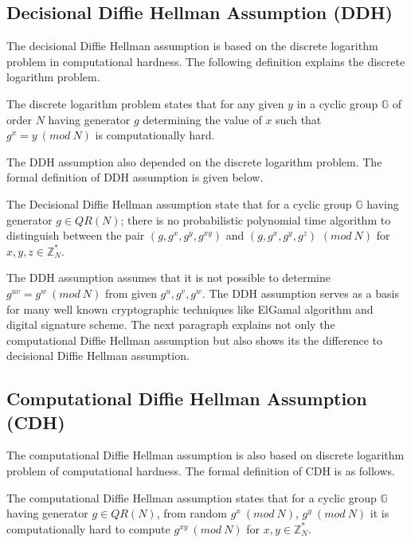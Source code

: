\subsection{Decisional Diffie Hellman Assumption (DDH)}\label{sub:DDH}
The decisional Diffie Hellman assumption is based on the discrete logarithm problem in computational hardness. The following definition explains the discrete logarithm problem.
\begin{definition} The discrete logarithm problem states that for any given $y$ in a cyclic group $\mathbb{G}$ of order $N$ having generator $g$ determining the value of $x$ such that $g^x = y ~(mod~N)$ is computationally hard.
\end{definition}

The DDH assumption also depended on the discrete logarithm problem. The formal definition of DDH assumption is given below.

\begin{definition} The Decisional Diffie Hellman assumption state that for a cyclic group $\mathbb{G}$ having generator $g \in QR(N)$; there is no probabilistic polynomial time algorithm to distinguish between the pair $(g, g^x, g^y, g^{xy})$ and $(g, g^x, g^y, g^z)$ $(mod~N)$ for $x, y, z \in \mathbb{Z}^*_N$.
\end{definition}

The DDH assumption assumes that it is not possible to determine $g^{uv} = g^w ~(mod~N)$ from given $ g^u, g^v, g^w$.
The DDH assumption serves as a basis for many well known cryptographic techniques like ElGamal algorithm and digital signature scheme. The next paragraph explains not only the computational Diffie Hellman assumption but also shows its the difference to decisional Diffie Hellman assumption.

\subsection{Computational Diffie Hellman Assumption (CDH)}\label{sub:CDH}
The computational Diffie Hellman assumption is also based on discrete logarithm problem of computational hardness. The formal definition of CDH is as follows. 
\begin{definition} The computational Diffie Hellman assumption states that for a cyclic group $\mathbb{G}$ having generator $g \in QR(N)$, from random $g^x ~(mod~N)$, $g^y ~(mod~N)$ it is computationally hard to compute $g^{xy}~(mod~N)$ for $x, y \in \mathbb{Z}^*_N $.
\end{definition}

